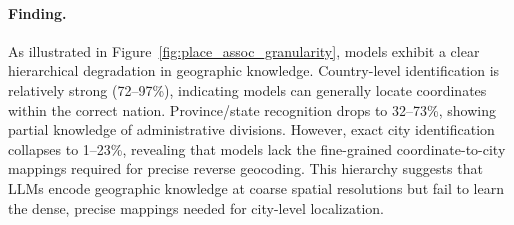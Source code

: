 \paragraph{Finding.}
As illustrated in Figure~\ref{fig:place_assoc_granularity}, models exhibit a clear hierarchical degradation in geographic knowledge. Country-level identification is relatively strong (72--97\%), indicating models can generally locate coordinates within the correct nation. Province/state recognition drops to 32--73\%, showing partial knowledge of administrative divisions. However, exact city identification collapses to 1--23\%, revealing that models lack the fine-grained coordinate-to-city mappings required for precise reverse geocoding. This hierarchy suggests that LLMs encode geographic knowledge at coarse spatial resolutions but fail to learn the dense, precise mappings needed for city-level localization.
